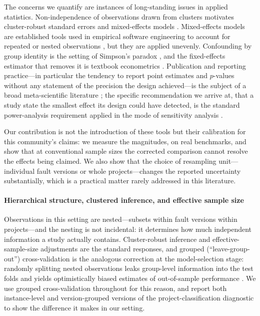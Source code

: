 \documentclass[preprint,12pt]{elsarticle}
\begin{document}
The concerns we quantify are instances of long-standing issues in applied
statistics. Non-independence of observations drawn from clusters motivates
cluster-robust standard errors and mixed-effects models
\cite{liang1986longitudinal}. Mixed-effects models are established tools
used in empirical software engineering to account for repeated or nested
observations \cite{ni2022justintime}, but they are applied unevenly.
Confounding by group identity is the setting of Simpson's paradox
\cite{simpson1951interpretation}, and the fixed-effects estimator that
removes it is textbook econometrics \cite{wooldridge2010econometric}.
Publication and reporting practice---in particular the tendency to report
point estimates and $p$-values without any statement of the precision the
design achieved---is the subject of a broad
meta-scientific literature \cite{ioannidis2005contamination}; the specific
recommendation we arrive at, that a study state the smallest effect its
design could have detected, is the standard power-analysis requirement
\cite{cohen1988statistical} applied in the mode of sensitivity analysis
\cite{hoenig2001abuse}.

Our contribution is not the introduction of these tools but their
calibration for this community's claims: we measure the magnitudes, on real
benchmarks, and show that at conventional sample sizes the corrected
comparison cannot resolve the effects being claimed. We also show that the
choice of resampling unit---individual fault versions or whole
projects---changes the reported uncertainty substantially, which is a
practical matter rarely addressed in this literature.

\paragraph{Hierarchical structure, clustered inference, and effective
sample size} Observations in this setting are nested---subsets within
fault versions within projects---and the nesting is not incidental: it
determines how much independent information a study actually contains.
Cluster-robust inference \cite{liang1986longitudinal} and effective-sample-size
adjustments are the standard responses, and grouped (``leave-group-out'')
cross-validation is the analogous correction at the model-selection stage:
randomly splitting nested observations leaks group-level information into
the test folds and yields optimistically biased estimates of out-of-sample
performance \cite{roberts2017crossvalidation}. We use grouped
cross-validation throughout for this reason, and report both instance-level
and version-grouped versions of the project-classification diagnostic to
show the difference it makes in our setting.
\end{document}
